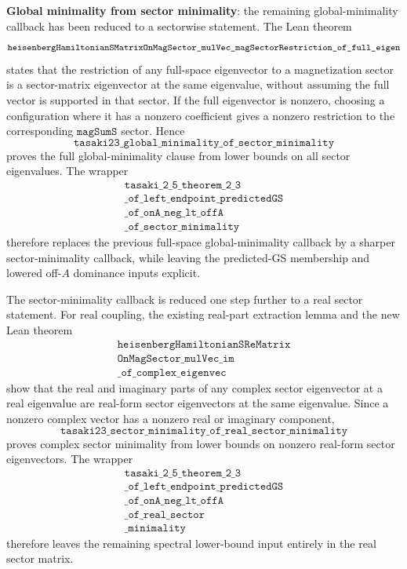 \documentclass[a4paper,11pt]{article}
\begin{document}
\textbf{Global minimality from sector minimality}: the remaining
global-minimality callback has been reduced to a sectorwise statement.
The Lean theorem
\[
\texttt{heisenbergHamiltonianSMatrixOnMagSector\_mulVec}\\
\texttt{\_magSectorRestriction\_of\_full\_eigen}
\]
states that the restriction of any full-space eigenvector to a
magnetization sector is a sector-matrix eigenvector at the same
eigenvalue, without assuming the full vector is supported in that
sector.  If the full eigenvector is nonzero, choosing a configuration
where it has a nonzero coefficient gives a nonzero restriction to the
corresponding \(\texttt{magSumS}\) sector.  Hence
\[
\texttt{tasaki23\_global\_minimality\_of\_sector\_minimality}
\]
proves the full global-minimality clause from lower bounds on all
sector eigenvalues.  The wrapper
\[
\begin{gathered}
\texttt{tasaki\_2\_5\_theorem\_2\_3}\\
\texttt{\_of\_left\_endpoint\_predictedGS}\\
\texttt{\_of\_onA\_neg\_lt\_offA}\\
\texttt{\_of\_sector\_minimality}
\end{gathered}
\]
therefore replaces the previous full-space global-minimality callback
by a sharper sector-minimality callback, while leaving the predicted-GS
membership and lowered off-\(A\) dominance inputs explicit.

The sector-minimality callback is reduced one step further to a real
sector statement.  For real coupling, the existing real-part extraction
lemma and the new Lean theorem
\[
\begin{gathered}
\texttt{heisenbergHamiltonianSReMatrix}\\
\texttt{OnMagSector\_mulVec\_im}\\
\texttt{\_of\_complex\_eigenvec}
\end{gathered}
\]
show that the real and imaginary parts of any complex sector eigenvector
at a real eigenvalue are real-form sector eigenvectors at the same
eigenvalue.  Since a nonzero complex vector has a nonzero real or
imaginary component,
\[
\texttt{tasaki23\_sector\_minimality\_of\_real\_sector\_minimality}
\]
proves complex sector minimality from lower bounds on nonzero real-form
sector eigenvectors.  The wrapper
\[
\begin{gathered}
\texttt{tasaki\_2\_5\_theorem\_2\_3}\\
\texttt{\_of\_left\_endpoint\_predictedGS}\\
\texttt{\_of\_onA\_neg\_lt\_offA}\\
\texttt{\_of\_real\_sector}\\
\texttt{\_minimality}
\end{gathered}
\]
therefore leaves the remaining spectral lower-bound input entirely in
the real sector matrix.
\end{document}
